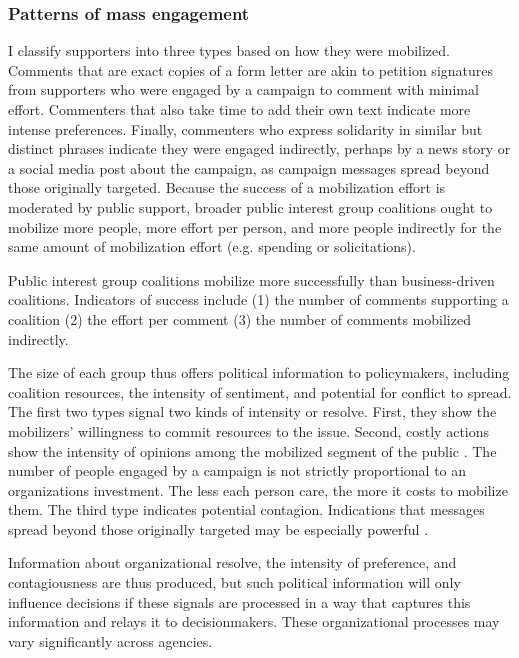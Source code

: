 \begin{subhyp}


\subsubsection{Patterns of mass engagement} I classify supporters into three types based on how they were mobilized. Comments that are exact copies of a form letter are akin to petition signatures from supporters who were engaged by a campaign to comment with minimal effort. Commenters that also take time to add their own text indicate more intense preferences. Finally, commenters who express solidarity in similar but distinct phrases indicate they were engaged indirectly, perhaps by a news story or a social media post about the campaign, 
as campaign messages spread beyond those originally targeted. Because the success of a mobilization effort is moderated by public support, broader public interest group coalitions ought to mobilize more people, more effort per person, and more people indirectly for the same amount of mobilization effort (e.g. spending or solicitations).  

\begin{hyp}
Public interest group coalitions mobilize more successfully than business-driven coalitions. Indicators of success include (1) the number of comments supporting a coalition (2) the effort per comment (3) the number of comments mobilized indirectly. 
\end{hyp}

\end{subhyp}

The size of each group thus offers political information to policymakers, including coalition resources, the intensity of sentiment, and potential for conflict to spread.
The first two types signal two kinds of intensity or resolve. First, they show the mobilizers' willingness to commit resources to the issue. Second, costly actions show the intensity of opinions among the mobilized segment of the public \citep{Dunleavy1991}. The number of people engaged by a campaign is not strictly proportional to an organizations investment. The less each person care, the more it costs to mobilize them. The third type indicates potential contagion. Indications that messages spread beyond those originally targeted may be especially powerful \citep{Kollman1998}. 

Information about organizational resolve, the intensity of preference, and contagiousness are thus produced, but%
such political information will only influence decisions if these signals are processed in a way that captures this information and relays it to decisionmakers. These organizational processes may vary significantly across agencies.

